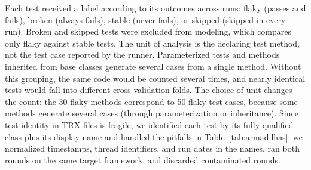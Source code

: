  Each test received a label according to its outcomes across runs: flaky (passes and fails), broken (always fails), stable (never fails), or skipped (skipped in every run).  Broken and skipped tests were excluded from modeling, which compares only flaky against stable tests.  The unit of analysis is the declaring test method, not the test case reported by the runner. Parameterized tests and methods inherited from base classes generate several cases from a single method. Without this grouping, the same code would be counted several times, and nearly identical tests would fall into different cross-validation folds. The choice of unit changes the count: the 30 flaky methods correspond to 50 flaky test cases, because some methods generate several cases (through parameterization or inheritance). Since test identity in TRX files is fragile, we identified each test by its fully qualified class plus its display name and handled the pitfalls in Table~\ref{tab:armadilhas}: we normalized timestamps, thread identifiers, and run dates in the names, ran both rounds on the same target framework, and discarded contaminated rounds.

